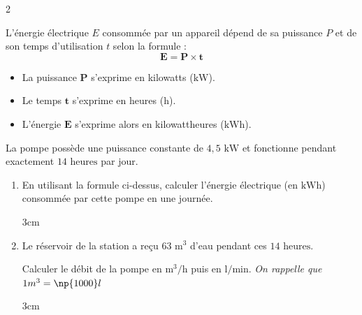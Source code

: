 \documentclass[a4paper]{book}
\begin{document}
{\begin{exerciceNote}{2}
        \begin{center}
        \begin{minipage}{0.8\textwidth}
            \begin{tcolorbox}[colback=gray!5,colframe=gray!40,arc=1mm,title=\small Rappel de cours,fonttitle=\bfseries\small,coltitle=black,colbacktitle=gray!20,size=small]
            L'énergie électrique $E$ consommée par un appareil dépend de sa puissance $P$ et de son temps d'utilisation $t$ selon la formule :
            $$\mathbf{E = P \times t}$$
            \begin{itemize}
                \item[$\bullet$] La puissance $\mathbf{P}$ s'exprime en kilowatts ($\text{kW}$).
                \item[$\bullet$] Le temps $\mathbf{t}$ s'exprime en heures ($\text{h}$).
                \item[$\bullet$] L'énergie $\mathbf{E}$ s'exprime alors en kilowattheures ($\text{kWh}$).
            \end{itemize}
            \end{tcolorbox}
        \end{minipage}
        \end{center}
        \medskip
        
        La pompe possède une puissance constante de $4,5\text{ kW}$ et fonctionne pendant exactement $14\text{ heures}$ par jour.
        \begin{enumerate}
            \item En utilisant la formule ci-dessus, calculer l'énergie électrique (en $\text{kWh}$) consommée par cette pompe en une journée.
            
            \begin{ZoneReponse}{3cm}
            \end{ZoneReponse}
            
            \item Le réservoir de la station a reçu $63\text{ m}^3$ d'eau pendant ces $14\text{ heures}$.
            
            Calculer le débit de la pompe en $\text{m}^3/\text{h}$ puis en $\text{l}/\text{min}$. \textit{On rappelle que $1m^3=\np{1000}l$}
            
            \begin{ZoneReponse}{3cm}
            \end{ZoneReponse}
        \end{enumerate}
    \end{exerciceNote}

}
\end{document}
